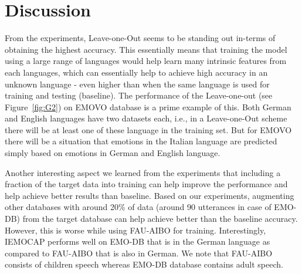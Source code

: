 \documentclass[a4paper]{article}
\newcommand*{\JE}[1]{\textcolor{magenta}{#1}}
\begin{document}

\section{Discussion}
\label{Sec: Insigts}
From the experiments, Leave-one-Out seems to be standing out in-terms of obtaining the highest accuracy. This essentially means that training the model using a large range of languages would help learn many intrinsic features from each languages, which can essentially help to achieve high accuracy in an unknown language - even higher than when the same language is used for training and testing (baseline). The performance of the Leave-one-out (see Figure~\ref{fig:G2}) on EMOVO database is a prime example of this. Both German and English languages have two datasets each, i.e., in a Leave-one-Out scheme there will be at least one of these language in the training set. But for EMOVO there will be a situation that emotions in the Italian language are predicted simply based on emotions in German and English language. 

Another interesting aspect we learned from the experiments that including a fraction of the target data into training can help improve the performance and help achieve better results than baseline. %
Based on our experiments, augmenting other databases with around 20\% of data (around 90 utterances in case of EMO-DB) from the target database can help achieve better than the baseline accuracy. However, this is worse while using FAU-AIBO for training. Interestingly, IEMOCAP performs well on EMO-DB that is in the German language as compared to FAU-AIBO that is also in German. We note that FAU-AIBO consists of children speech whereas EMO-DB database contains adult speech.
 
\end{document}
